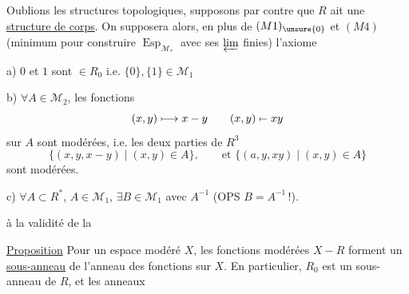 Oublions les structures topologiques, supposons par contre que $R$ ait une \uline{structure de corps}. On supposera alors,  en plus de $(M1)_{\unsure{0}}$ et $(M4)$ (minimum pour construire $\operatorname{Esp}_{\mathcal M_*}$ avec ses $\varprojlim$ finies) l'axiome


a) $0$ et $1$ sont $\in R_0$ i.e. $\{0\},\{1\}\in\mathcal M_1$

b) $\forall A\in\mathcal M_2$, les fonctions
\[
 (x,y)\longmapsto x-y\qquad
 (x,y)\mathrel{\mapstochar\relbar}xy
\]
sur $A$ sont modérées,  i.e. les deux parties de $R^3$
\[
 \{(x,y,x-y)\mid(x,y)\in A\},\qquad\text{et }\{(a,y,xy)\mid(x,y)\in A\}
\]
sont modérées.

c) $\forall A\subset R^*$, $A\in\mathcal M_1$, $\exists B\in\mathcal M_1$ avec $A^{-1}$  (OPS $B=A^{-1}$\,!).

    à la validité de la


\uline{Proposition} Pour un espace modéré $X$, les fonctions modérées $X\mathbin{-}R$  forment un \uline{sous-anneau} de l'anneau des fonctions  sur $X$. En particulier, $R_0$ est un sous-anneau de $R$, et les anneaux
